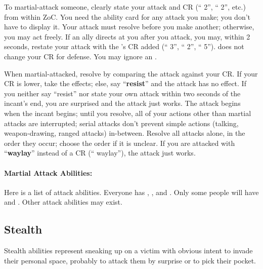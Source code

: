\documentclass[sheet]{airship}
\begin{document}
To martial-attack someone, clearly state your attack and CR
(``\aKnockOut{} 2'', ``\aWound{} 2'', etc.) from within ZoC.  You need
the ability card for any attack you make; you don't have to display
it.  Your attack must resolve before you make another; otherwise, you
may act freely.  If an ally directs {\bf \aAssist{}} at you after you
attack, you may, within 2 seconds, restate your attack with the
\aAssist{}'s CR added (``\aWound{} 3'', ``\aAssist{} 2'', ``\aWound{}
5'').  \aAssist{} does not change your CR for defense.  You may ignore
an \aAssist{}.

When martial-attacked, resolve by comparing the attack against your
CR.  If your CR is lower, take the effects; else, say ``{\bf resist}''
and the attack has no effect.  If you neither say ``resist'' nor state
your own attack within two seconds of the incant's end, you are
surprised and the attack just works.  The attack begins when the
incant begins; until you resolve, all of your actions other than
martial attacks are interrupted; serial attacks don't prevent simple
actions (talking, weapon-drawing, ranged attacks) in-between.  Resolve
all attacks alone, in the order they occur; choose the order if it is
unclear.  If you are attacked with ``{\bf waylay}'' instead of a CR
(``\aKnockOut{} waylay''), the attack just works.

\paragraph{Martial Attack Abilities:} Here is a list of attack
abilities.  Everyone has \aKnockOut{}, \aWound{}, and \aAssist{}.
Only some people will have \aDisarm{} and \aRestrain{}.  Other attack
abilities may exist.\nopagebreak

\begingroup
  \aKnockOut{}
  \aWound{}
  \aAssist{}
  \aDisarm{}
  \aRestrain{}
\endgroup

\subsection{Stealth}

Stealth abilities represent sneaking up on a victim with obvious
intent to invade their personal space, probably to attack them by
surprise or to pick their pocket.
\end{document}

